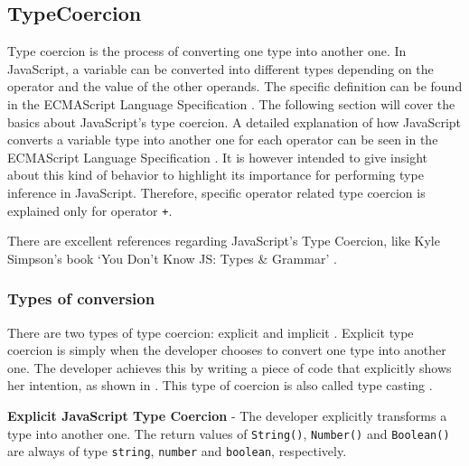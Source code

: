 \subsection{TypeCoercion} \label{sec:background-js-type-coercion}
Type coercion is the process of converting one type into another one. In JavaScript, a variable can be converted into different types depending on the operator and the value of the other operands. The specific definition can be found in the ECMAScript Language Specification \citep{ecma-script}. The following section will cover the basics about JavaScript's type coercion. A detailed explanation of how JavaScript converts a variable type into another one for each operator can be seen in the ECMAScript Language Specification \citep{ecma-script}. It is however intended to give insight about this kind of behavior to highlight its importance for performing type inference in JavaScript. Therefore, specific operator related type coercion is explained only for operator \texttt{+}.

There are excellent references regarding JavaScript's Type Coercion, like Kyle Simpson's book `You Don't Know JS: Types \& Grammar' \citep{you-dont-know-js}.

\subsubsection{Types of conversion}
\label{types_of_conversion}
There are two types of type coercion: explicit and implicit \citep{you-dont-know-js}. Explicit type coercion is simply when the developer chooses to convert one type into another one. The developer achieves this by writing a piece of code that explicitly shows her intention, as shown in . This type of coercion is also called type casting \citep{you-dont-know-js}.

\begin{code}
	\captionsetup{aboveskip=0pt, belowskip=10pt}
	\caption[Explicit JavaScript Type Coercion]{\textbf{Explicit JavaScript Type Coercion} - The developer explicitly transforms a type into another one. The return values of \texttt{String()}, \texttt{Number()} and \texttt{Boolean()} are always of type \texttt{string}, \texttt{number} and \texttt{boolean}, respectively.}
	\label{code:background-explicit-type-coercion}
  \end{code}

